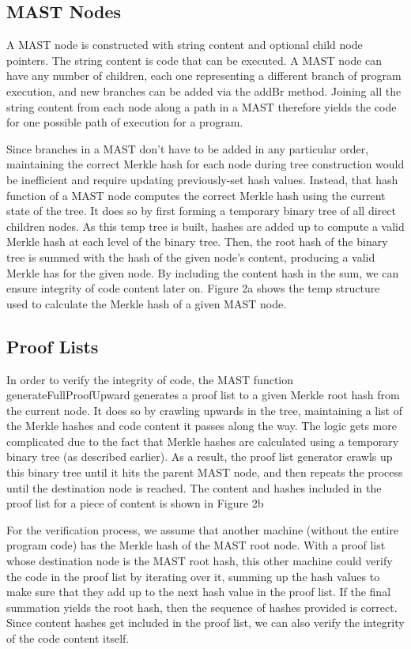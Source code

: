 \documentclass{vldb}
\begin{document}
\subsection{MAST Nodes}

A MAST node is constructed with string content and optional child node pointers. The string content is code that can be executed. A MAST node can have any number of children, each one representing a different branch of program execution, and new branches can be added via the addBr method. Joining all the string content from each node along a path in a MAST therefore yields the code for one possible path of execution for a program.
 
Since branches in a MAST don’t have to be added in any particular order, maintaining the correct Merkle hash for each node during tree construction would be inefficient and require updating previously-set hash values. Instead, that hash function of a MAST node computes the correct Merkle hash using the current state of the tree. It does so by first forming a temporary binary tree of all direct children nodes. As this temp tree is built, hashes are added up to compute a valid Merkle hash at each level of the binary tree. Then, the root hash of the binary tree is summed with the hash of the given node’s content, producing a valid Merkle has for the given node. By including the content hash in the sum, we can ensure integrity of code content later on. Figure 2a shows the temp structure used to calculate the Merkle hash of a given MAST node.

\subsection{Proof Lists}

In order to verify the integrity of code, the MAST function generateFullProofUpward  generates a proof list to a given Merkle root hash from the current node. It does so by crawling upwards in the tree, maintaining a list of the Merkle hashes and code content it passes along the way. The logic gets more complicated due to the fact that Merkle hashes are calculated using a temporary binary tree (as described earlier). As a result, the proof list generator crawls up this binary tree until it hits the parent MAST node, and then repeats the process until the destination node is reached. The content and hashes included in the proof list for a piece of content is shown in Figure 2b

For the verification process, we assume that another machine (without the entire program code) has the Merkle hash of the MAST root node. With a proof list whose destination node is the MAST root hash, this other machine could verify the code in the proof list by iterating over it, summing up the hash values to make sure that they add up to the next hash value in the proof list. If the final summation yields the root hash, then the sequence of hashes provided is correct. Since content hashes get included in the proof list, we can also verify the integrity of the code content itself.
\end{document}
